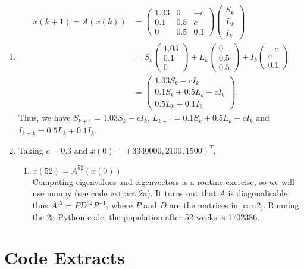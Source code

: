 \documentclass[a4paper]{article}
\theoremstyle{plain}
\theoremstyle{definition}
\begin{document}
\begin{enumerate}[label=\textbf{\arabic*})]
	\item
	      \begin{align*}
		      x(k+1)=A(x(k)) & =\begin{pmatrix}1.03 & 0 & -c \\0.1&0.5&c\\0&0.5&0.1\end{pmatrix}\begin{pmatrix}S_k\\L_k\\I_k\end{pmatrix}                        \\
		                     & =S_k\begin{pmatrix}1.03\\0.1\\0\end{pmatrix}+L_k\begin{pmatrix}0\\0.5\\0.5\end{pmatrix}+I_k\begin{pmatrix}-c\\c\\0.1\end{pmatrix} \\
		                     & =\begin{pmatrix}1.03S_k-cI_k\\0.1S_k+0.5L_k+cI_k\\0.5L_k+0.1I_k\end{pmatrix}.
	      \end{align*}
	      Thus, we have $S_{k+1}=1.03S_k-cI_k$, $L_{k+1}=0.1S_k+0.5L_k+cI_k$ and $I_{k+1}=0.5L_k+0.1I_k$.
	\item Taking $c=0.3$ and $x(0)=(3340000,2100,1500)^T$,
	      \begin{enumerate}
		      \item $x(52)=A^{52}(x(0))$\\
		            Computing eigenvalues and eigenvectors is a routine exercise, so we will use numpy (see code extract 2a).
		            It turns out that $A$ is diagonalisable, thus $A^{52} = PD^{52}P^{-1}$, where $P$ and $D$ are the
		            matrices in \ref{cor:2}. Running the 2a Python code, the population after 52 weeks is 1702386.
	      \end{enumerate}
\end{enumerate}

\section{Code Extracts}
%
%

% 
\nocite{*}

\appendix

\end{document}
